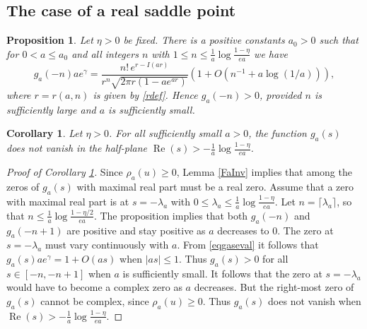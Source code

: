 \documentclass[11pt]{amsart}
\newtheorem{corollary}{Corollary}
\newtheorem{proposition}{Proposition}
\DeclareMathOperator{\re}{Re}
\begin{document}
\subsection{The case of a real saddle point}

\begin{proposition}\label{propreal}
Let $\eta>0$ be fixed. 
There is a positive constants $a_0>0$ such that for $0<a\le a_0$ and all integers $n$ with
$
1 \le n \le \frac{1}{a}\log \frac{1-\eta}{ea}
$
we have 
$$
g_a(-n) a e^\gamma = \frac{n! \, e^{r-I(ar)}}{r^n \sqrt{2\pi r\left(1-a e^{a r}\right)}} \left(1+O(n^{-1}+ a \log (1/a) )\right),
$$
where $r=r(a,n)$ is given by \eqref{rdef}. Hence $g_a(-n)>0$, provided $n$ is sufficiently large and $a$ is sufficiently small.
\end{proposition}

\begin{corollary}\label{corlambdalb}
Let $\eta>0$. For all sufficiently small $a>0$, the function $g_a(s)$ does not vanish in the half-plane $\re(s)>  -\frac{1}{a}\log  \frac{1-\eta}{e a}$.
\end{corollary}

\begin{proof}[Proof of Corollary \ref{corlambdalb}]
Since $\rho_a(u) \ge 0$, Lemma \ref{FaInv} implies that among the zeros of $g_a(s)$ with maximal real part must be a real zero. 
Assume that a zero with maximal real part is at $s=-\lambda_a$ with $0\le \lambda_a \le  \frac{1}{a}\log  \frac{1-\eta}{e a}$.
Let $n=\lceil \lambda_a \rceil$, so that $n \le \frac{1}{a}\log  \frac{1-\eta/2}{e a}$. The proposition implies that both
$g_a(-n)$ and $g_a(-n+1)$ are positive and stay positive as $a$ decreases to $0$. The zero at $s=-\lambda_a$ must vary continuously with $a$.
From \eqref{eqgaseval} it follows that $g_a(s) a e^\gamma = 1 +O(as)$ when $|as|\le 1$. Thus
 $g_a(s)>0$ for all $s \in [-n, -n+1]$ when $a$ is sufficiently small. It follows that the zero at $s=-\lambda_a$  would have to 
become a complex zero as $a$ decreases. But the right-most zero of $g_a(s)$ cannot be complex, since $\rho_a(u) \ge 0$. 
Thus $g_a(s)$ does not vanish when $\re(s)> - \frac{1}{a}\log  \frac{1-\eta}{e a}$.
\end{proof}
\end{document}
